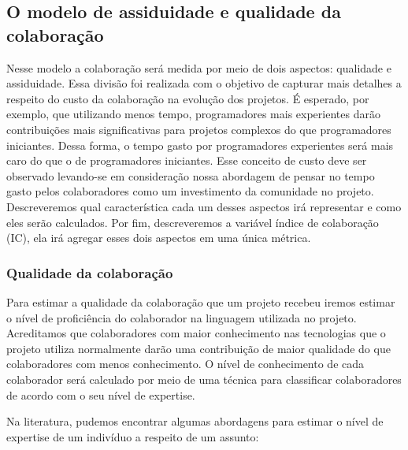 \subsection{O modelo de assiduidade e qualidade da colaboração}

Nesse modelo a colaboração será medida por meio de dois aspectos:  qualidade e assiduidade. Essa divisão foi realizada com o objetivo de capturar mais detalhes a respeito do custo da colaboração na evolução dos projetos.  É esperado, por exemplo, que utilizando menos tempo, programadores mais experientes darão contribuições mais significativas para projetos complexos do que programadores iniciantes. Dessa forma, o tempo gasto por programadores experientes será mais caro do que o de programadores iniciantes. Esse conceito de custo deve ser observado levando-se em consideração nossa abordagem de pensar no tempo gasto pelos colaboradores como um investimento da comunidade no projeto.  Descreveremos qual  característica cada um desses aspectos irá representar e como eles serão calculados. Por fim, descreveremos a variável índice de colaboração (IC), ela irá agregar esses dois aspectos em uma única métrica.

\subsubsection{Qualidade da colaboração}
\label{cap_modelo_colaboracao_concreto}

Para estimar a qualidade da colaboração que um projeto recebeu iremos estimar o  nível de proficiência do colaborador na linguagem utilizada no projeto. Acreditamos que colaboradores com maior conhecimento nas tecnologias que o projeto utiliza normalmente darão uma contribuição de maior qualidade do que colaboradores com menos conhecimento. O nível de conhecimento de cada colaborador será calculado por meio de uma técnica para classificar colaboradores de acordo com o seu nível de expertise. 

Na literatura, pudemos encontrar algumas abordagens para estimar o nível de expertise de um indivíduo a respeito de um assunto:  


